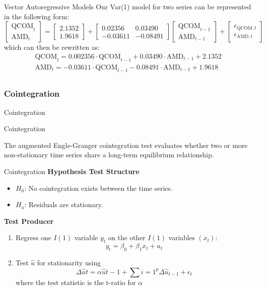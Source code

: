 \documentclass{beamer}[9pt]
\begin{document}
\begin{frame}{Vector Autoregressive Models}
Our Var(1) model for two series can be represented in the following form:
\[
	\begin{bmatrix}
	\text{QCOM}_t \\
	\text{AMD}_t
\end{bmatrix}
=
\begin{bmatrix}
	2.1352 \\
	1.9618
\end{bmatrix}
+
\begin{bmatrix}
	0.02356 & 0.03490 \\
	-0.03611 & -0.08491
\end{bmatrix}
\begin{bmatrix}
	\text{QCOM}_{t-1} \\
	\text{AMD}_{t-1}
\end{bmatrix}
+
\begin{bmatrix}
	\epsilon_{\text{QCOM},t} \\
	\epsilon_{\text{AMD},t}
\end{bmatrix}
\]
which can then be rewritten as:
	\[
		\begin{aligned}
		\text{QCOM}_t=0.002356\cdot\text{QCOM}_{t-1}+0.03490\cdot\text{AMD}_{t-1}+2.1352\\
		\text{AMD}_t=-0.03611\cdot\text{QCOM}_{t-1}-0.08491\cdot\text{AMD}_{t-1}+1.9618\\
	\end{aligned}
	\]
\end{frame}
\begin{frame}
\frametitle{Cointegration}

\centering
{\Large Cointegration}
\end{frame}



\begin{frame}{Cointegration}

	The augmented Engle-Granger cointegration test evaluates whether two or more non-stationary time series share a long-term equilibrium relationship.
\end{frame}

\begin{frame}{Cointegration}
	\textbf{Hypothesis Test Structure}
	\begin{itemize}
		\item $H_0$: No cointegration exists between the time series.
		\item $H_a$: Residuals are stationary.
	\end{itemize}

	\textbf{Test Producer}
	\begin{enumerate}
		\item Regress one $I(1)$ variable $y_t$ on the other $I(1)$ variables $(x_t)$:
		\[
			y_t=\beta_0+\beta_1 x_t+u_t
		\]
		\item Test $\hat{u}$ for stationarity using 
		\[
			\Delta\hat{u} t=\alpha\hat{u} t-1+\sum i=1^{p}\Delta\hat{u}_{t-1}+\epsilon_t
		\]
		where the test statistic is the t-ratio for $\alpha$
	\end{enumerate}
\end{frame}
\end{document}
